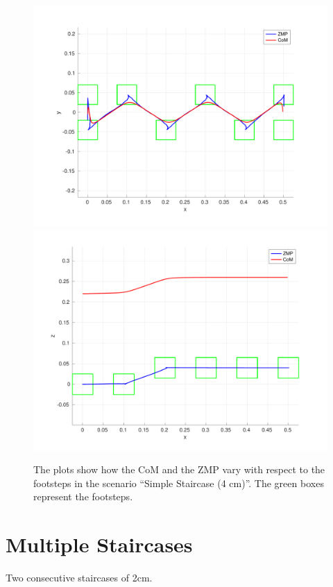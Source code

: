 \begin{figure}
  \centering
  \includegraphics[width=\textwidth]
      {figures/experiments/simple-staircase/xy-plot-4cm.pdf}
  \includegraphics[width=\textwidth]
      {figures/experiments/simple-staircase/xz-plot-4cm.pdf}
  \caption{The plots show how the CoM and the ZMP vary with respect to the
		footsteps in the scenario ``Simple Staircase (4 cm)''.
    The green boxes represent the footsteps.}
  \label{fig:experiments:simple-staircase:comzmp}
\end{figure}

\section{Multiple Staircases}
Two consecutive staircases of 2cm.

